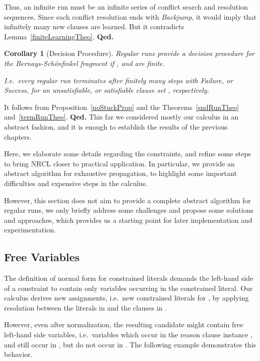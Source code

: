 \documentclass[a4paper]{article}
\newcommand{\mEPR}{Bernays-Sch\"onfinkel}
\newcommand{\startproof}{{\bf Proof:~}}
\newcommand{\finishproof}{{\bf Qed.}}
\newtheorem{coro}[defi]{Corollary}
\begin{document}
{Thus, an infinite run must be an infinite series of conflict search and resolution sequences. Since each conflict resolution ends with 
\emph{Backjump}, it would imply that infinitely many new clauses are learned. But it contradicts Lemma~\ref{finiteLearningTheo}. 
\finishproof

\begin{coro}[Decision Procedure]Regular runs provide a decision procedure for the {\mEPR} fragment if ,  and  are finite.

I.e.\ every regular run terminates after finitely many steps with \emph{Failure}, or \emph{Success}, for an unsatisfiable, or satisfiable 
clause set , respectively.
\end{coro}
\noindent\startproof It follows from Proposition~\ref{noStuckProp} and the Theorems~\ref{sndRunTheo} and~\ref{termRunTheo}.
\finishproof
This far we considered mostly our calculus in an abstract fashion, and it is enough to establish 
the results of the previous chapters.

Here, we elaborate some details regarding the constraints, 
and refine some steps to bring NRCL closer to practical application. 
In particular, we provide an abstract algorithm for exhaustive propagation, 
to highlight some important difficulties and expensive steps in the calculus.

However, this section does not aim to provide a complete abstract algorithm for regular runs, we 
only briefly address some challenges and propose some solutions and approaches, 
which provides us a starting point for later implementation and experimentation.
\subsection{Free Variables}
\newcommand\restr[2]{\ensuremath{\left.#1\right|_{#2}}}
The definition of normal form for constrained literals demands the left-hand side of a constraint to contain only variables 
occurring in the constrained literal. 
Our calculus derives new assignments, i.e.\ new constrained literals for , by applying 
resolution between the literals in  and the clauses in . 

However, even after normalization, the resulting candidate  might contain
free left-hand side variables, i.e.\ variables which occur in the reason clause instance , 
and still occur in , 
but do not occur in . 
The following example demonstrates this behavior.

}
\end{document}
